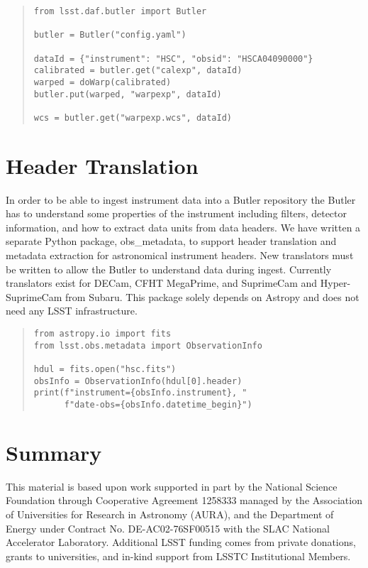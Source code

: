 \documentclass[11pt,twoside]{article}
\begin{document}
\begin{quote}
\begin{small}
\begin{verbatim}
from lsst.daf.butler import Butler

butler = Butler("config.yaml")

dataId = {"instrument": "HSC", "obsid": "HSCA04090000"}
calibrated = butler.get("calexp", dataId)
warped = doWarp(calibrated)
butler.put(warped, "warpexp", dataId)

wcs = butler.get("warpexp.wcs", dataId)
\end{verbatim}
\end{small}
\end{quote}

\section{Header Translation}

In order to be able to ingest instrument data into a Butler repository the Butler has to understand some properties of the instrument including filters, detector information, and how to extract data units from data headers.
We have written a separate Python package, obs\_metadata, to support header translation and metadata extraction for astronomical instrument headers.
New translators must be written to allow the Butler to understand data during ingest.
Currently translators exist for DECam, CFHT MegaPrime, and SuprimeCam and Hyper-SuprimeCam from Subaru.
This package solely depends on Astropy and does not need any LSST infrastructure.

\begin{quote}
\begin{small}
\begin{verbatim}
from astropy.io import fits
from lsst.obs.metadata import ObservationInfo

hdul = fits.open("hsc.fits")
obsInfo = ObservationInfo(hdul[0].header)
print(f"instrument={obsInfo.instrument}, "
      f"date-obs={obsInfo.datetime_begin}")
\end{verbatim}
\end{small}
\end{quote}

\section{Summary}

\acknowledgements This material is based upon work supported in part by the National Science Foundation through Cooperative Agreement 1258333 managed by the Association of Universities for Research in Astronomy (AURA), and the Department of Energy under Contract No. DE-AC02-76SF00515 with the SLAC National Accelerator Laboratory.
Additional LSST funding comes from private donations, grants to universities, and in-kind support from LSSTC Institutional Members.

\end{document}

